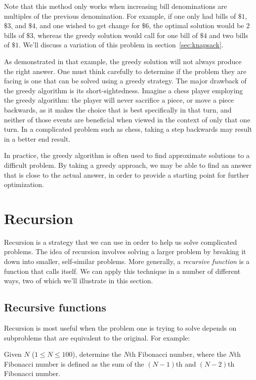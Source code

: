 Note that this method only works when increasing bill denominations are multiples of the previous denomination.  For example, if one only had bills of $ \$1 $, $ \$3 $, and $ \$4 $, and one wished to get change for $ \$6 $, the optimal solution would be $ 2 $ bills of $ \$3 $, whereas the greedy solution would call for one bill of $ \$4 $ and two bills of $ \$1 $. We'll discuss a variation of this problem in section~\ref{sec:knapsack}.

As demonstrated in that example, the greedy solution will not always produce the right answer.  One must think carefully to determine if the problem they are facing is one that can be solved using a greedy strategy.  The major drawback of the greedy algorithm is its short-sightedness. Imagine a chess player employing the greedy algorithm: the player will never sacrifice a piece, or move a piece backwards, as it makes the choice that is best specifically in that turn, and neither of those events are beneficial when viewed in the context of only that one turn.  In a complicated problem such as chess, taking a step backwards may result in a better end result.

In practice, the greedy algorithm is often used to find approximate solutions to a difficult problem.  By taking a greedy approach, we may be able to find an answer that is close to the actual answer, in order to provide a starting point for further optimization.

\section{Recursion} \label{recursion}

Recursion is a strategy that we can use in order to help us solve complicated problems. The idea of recursion involves solving a larger problem by breaking it down into smaller, self-similar problems. More generally, a \textit{recursive function} is a function that calls itself. We can apply this technique in a number of different ways, two of which we'll illustrate in this section.

\subsection{Recursive functions}

Recursion is most useful when the problem one is trying to solve depends on subproblems that are equivalent to the original.  For example:

\begin{Problem}
Given $ N $ ($ 1 \leq N \leq 100 $), determine the $ N $th Fibonacci number, where the $N$th Fibonacci number is defined as the sum of the $(N-1)$th and $(N-2)$th Fibonacci number. 
\end{Problem}

